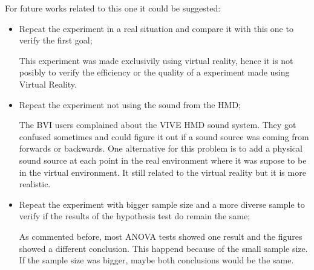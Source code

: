 For future works related to this one it could be suggested:

\begin{itemize}
    \item Repeat the experiment in a real situation and compare it with this one to verify the first goal;
    
    This experiment was made exclusivily using virtual reality, hence it is not posibly to verify the efficiency or the quality of a experiment made using Virtual Reality.

    \item Repeat the experiment not using the sound from the HMD;
     
    The BVI users complained about the VIVE HMD sound system. They got confused sometimes and could figure it out if a sound source was coming from forwards or backwards. One alternative for this problem is to add a physical sound source at each point in the real environment where it was supose to be in the virtual environment. It still related to the virtual reality but it is more realistic. 

    \item Repeat the experiment with bigger sample size and a more diverse sample to verify if the results of the hypothesis test do remain the same;
    
    As commented before, most ANOVA tests showed one result and the figures showed a different conclusion. This happend because of the small sample size. If the sample size was bigger, maybe both conclusions would be the same.

\end{itemize}